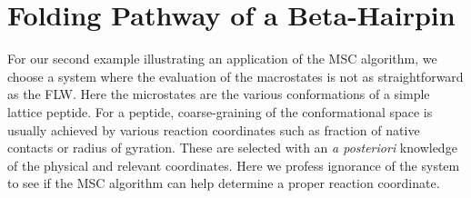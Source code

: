 \FloatBarrier


\section{Folding Pathway of a Beta-Hairpin}
%
For our second example illustrating an application of the MSC algorithm, we choose a system where the evaluation of the macrostates is not as straightforward as the FLW. Here the microstates are the various conformations of a simple lattice peptide. For a peptide, coarse-graining of the conformational space is usually achieved by various reaction coordinates such as fraction of native contacts or radius of gyration. These are selected with an \emph{a posteriori} knowledge of the physical and relevant coordinates. Here we profess ignorance of the system to see if the MSC algorithm can help determine a proper reaction coordinate. 

